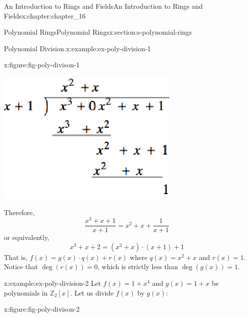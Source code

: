 \documentclass[twoside,10pt,]{book}
\numberwithin{equation}{section}
\begin{document}
\begin{chapterptx}{An Introduction to Rings and Fields}{}{An Introduction to Rings and Fields}{}{}{x:chapter:chapter_16}
\begin{sectionptx}{Polynomial Rings}{}{Polynomial Rings}{}{}{x:section:s-polynomial-rings}
\begin{example}{Polynomial Division.}{x:example:ex-poly-division-1}
\begin{figureptx}{}{x:figure:fig-poly-divison-1}{}
\begin{image}{0.275}{0.45}{0.275}
\includegraphics[width=\linewidth]{images/fig-poly-divison-1.png}
\end{image}%
\tcblower
\end{figureptx}%
Therefore,%
\begin{equation*}
\frac{x^3 + x + 1}{x+ 1}= x^2+ x + \frac{1}{x + 1}
\end{equation*}
or equivalently,%
\begin{equation*}
x^3 + x + 2= \left( x^2+ x\right)\cdot (x+1) + 1
\end{equation*}
That is, \(f(x) = g(x)\cdot q(x) + r(x)\) where \(q(x) = x^2+x\) and \(r(x) = 1\).  Notice that  \(\deg (r(x)) = 0\), which is strictly less than \(\deg (g(x)) = 1\).%
\end{example}
\begin{example}{}{x:example:ex-poly-division-2}%
Let \(f(x) = 1 +x^4\) and \(g(x) = 1 + x\) be polynomials in \(\mathbb{Z}_2[x]\).  Let us divide \(f(x)\) by \(g(x)\):%
\begin{figureptx}{}{x:figure:fig-poly-divison-2}{}%
\begin{image}{0.225}{0.55}{0.225}%

\end{image}
\end{figureptx}
\end{example}
\end{sectionptx}
\end{chapterptx}
\end{document}
